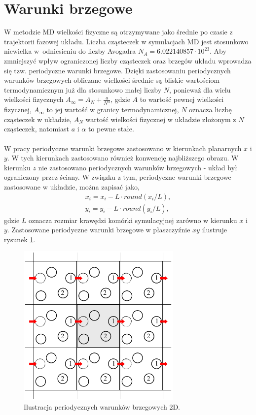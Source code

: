 \documentclass[12pt,a4paper,openright]{report} %
\begin{document}
\section{Warunki brzegowe}
\label{warbrzeg}
%
W metodzie MD wielkości fizyczne są otrzymywane jako średnie po czasie z trajektorii fazowej układu. Liczba cząsteczek w symulacjach MD jest stosunkowo niewielka w~odniesieniu do liczby Avogadra $N_A=6.022140857 \cdot 10^{23}$. Aby zmniejszyć wpływ ograniczonej liczby cząsteczek oraz brzegów układu wprowadza się tzw. periodyczne warunki brzegowe. Dzięki zastosowaniu periodycznych warunków brzegowych obliczane wielkości średnie są bliskie wartościom termodynamicznym już dla stosunkowo małej liczby $N$, ponieważ dla wielu wielkości fizycznych $A_{\infty} = A_N + \frac{a}{N^\alpha}$, gdzie $A$ to wartość pewnej wielkości fizycznej, $A_{\infty}$ to jej wartość w granicy termodynamicznej, $N$ oznacza liczbę cząsteczek w układzie, $A_{N}$ wartość wielkości fizycznej w układzie złożonym z $N$ cząsteczek, natomiast $a$ i $\alpha$ to pewne stałe. 
\\
\\
W pracy periodyczne warunki brzegowe zastosowano w kierunkach planarnych $x$ i $y$. W tych kierunkach zastosowano również konwencję najbliższego obrazu. W kierunku $z$ nie zastosowano periodycznych warunków brzegowych - układ był ograniczony przez ściany. W związku z tym, periodyczne warunki brzegowe zastosowane w układzie, można zapisać jako,
\begin{equation}
\begin{gathered}
x_i=x_i-L \cdot round (x_i / L), \\
y_i=y_i-L \cdot round (y_i / L),
\end{gathered}
\end{equation}
gdzie $L$ oznacza rozmiar krawędzi komórki symulacyjnej zarówno w kierunku $x$ i $y$. Zastosowane periodyczne warunki brzegowe w płaszczyźnie $xy$ ilustruje rysunek \ref{period_war_brz}.
\begin{figure}[h]
\centering
\includegraphics[width=80mm]{rysunki/PBC.pdf}
\caption{Ilustracja periodycznych warunków brzegowych 2D.}
\label{period_war_brz}
\end{figure}
\end{document}
